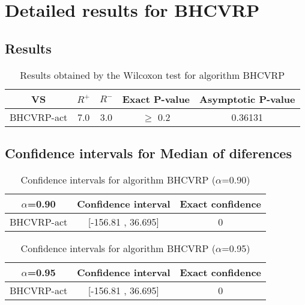 \documentclass[a4paper,10pt]{article}
\begin{document}
 \clearpage 


\section{Detailed results for BHCVRP}


\subsection{Results}

\begin{table}[!htp]
\centering\small
\begin{tabular}{
|c|c|c|c|c|}
\hline
 VS & $R^{+}$ & $R^{-}$ & Exact P-value & Asymptotic P-value \\ \hline 
BHCVRP-act & 7.0 & 3.0 & $\geq$ 0.2 & 0.36131\\ \hline 

\end{tabular}
\caption{Results obtained by the Wilcoxon test for algorithm BHCVRP}
\end{table}

\subsection{Confidence intervals for Median of diferences}

\begin{table}[!htp]
\centering\small
\begin{tabular}{
|c|c|c|}
\hline
 $\alpha$=0.90 & Confidence interval & Exact confidence \\ \hline 
BHCVRP-act & [-156.81 , 36.695] & 0\\ \hline 

\end{tabular}
\caption{Confidence intervals for algorithm BHCVRP ($\alpha$=0.90)}
\end{table}
\begin{table}[!htp]
\centering\small
\begin{tabular}{
|c|c|c|}
\hline
 $\alpha$=0.95 & Confidence interval & Exact confidence \\ \hline 
BHCVRP-act & [-156.81 , 36.695] & 0\\ \hline 

\end{tabular}
\caption{Confidence intervals for algorithm BHCVRP ($\alpha$=0.95)}
\end{table}

 \clearpage 
\end{document}
